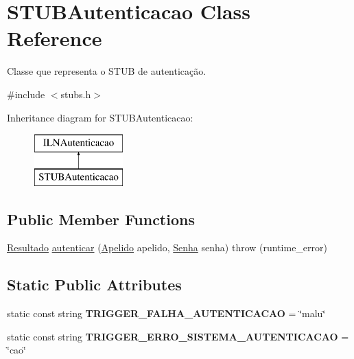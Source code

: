 \hypertarget{classSTUBAutenticacao}{}\section{S\+T\+U\+B\+Autenticacao Class Reference}
\label{classSTUBAutenticacao}


Classe que representa o S\+T\+UB de autenticação.  




{\ttfamily \#include $<$stubs.\+h$>$}

Inheritance diagram for S\+T\+U\+B\+Autenticacao\+:\begin{figure}[H]
\begin{center}
\leavevmode
\includegraphics[height=2.000000cm]{classSTUBAutenticacao}
\end{center}
\end{figure}
\subsection*{Public Member Functions}
\begin{DoxyCompactItemize}
\item 
\hyperlink{classResultado}{Resultado} \hyperlink{classSTUBAutenticacao_a63f0480adb96e8575700698a47dc2984}{autenticar} (\hyperlink{classApelido}{Apelido} apelido, \hyperlink{classSenha}{Senha} senha)  throw (runtime\+\_\+error)
\end{DoxyCompactItemize}
\subsection*{Static Public Attributes}
\begin{DoxyCompactItemize}
\item 
\mbox{\label{classSTUBAutenticacao_a1ef623ead776d172cdcf868ceeb54cdf}} 
static const string {\bfseries T\+R\+I\+G\+G\+E\+R\+\_\+\+F\+A\+L\+H\+A\+\_\+\+A\+U\+T\+E\+N\+T\+I\+C\+A\+C\+AO} = \char`\"{}malu\char`\"{}
\item 
\mbox{\label{classSTUBAutenticacao_a7c598d8ac99b7dfc652bd2c7c617d29f}} 
static const string {\bfseries T\+R\+I\+G\+G\+E\+R\+\_\+\+E\+R\+R\+O\+\_\+\+S\+I\+S\+T\+E\+M\+A\+\_\+\+A\+U\+T\+E\+N\+T\+I\+C\+A\+C\+AO} = \char`\"{}cao\char`\"{}
\end{DoxyCompactItemize}



